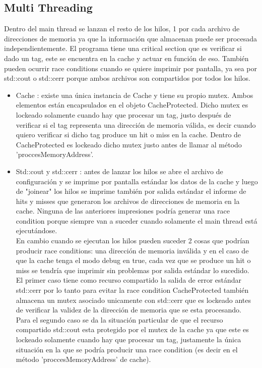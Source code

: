 \documentclass[a4paper,12pt]{report}
\begin{document}
\subsection{Multi Threading}

Dentro del main thread se lanzan el resto de los hilos, 1 por cada archivo de direcciones de memoria ya que la informaci\'on que almacenan puede ser procesada independientemente. El programa tiene una critical section que es verificar si dado un tag, este se encuentra en la cache y actuar en funci\'on de eso. Tambi\'en pueden ocurrir race conditions cuando se quiere imprimir por pantalla, ya sea por std::cout o std::cerr porque ambos archivos son compartidos por todos los hilos.

\begin{itemize}

\item Cache : existe una \'unica instancia de Cache y tiene su propio mutex. Ambos elementos est\'an encapsulados en el objeto CacheProtected. Dicho mutex es lockeado solamente cuando hay que procesar un tag, justo despu\'es de verificar si el tag representa una direcci\'on de memoria v\'alida, es decir cuando quiero verificar si dicho tag produce un hit o miss en la cache. Dentro de CacheProtected es lockeado dicho mutex justo antes de llamar al m\'etodo 'proccesMemoryAddress'.

\item Std::cout y std::cerr : antes de lanzar los hilos se abre el archivo de configuraci\'on y se imprime por pantalla est\'andar los datos de la cache y luego de "joinear" los hilos se imprime tambi\'en por salida est\'andar el informe de hits y misses que generaron los archivos de direcciones de memoria en la cache. Ninguna de las anteriores impresiones podr\'ia generar una race condition porque siempre van a suceder cuando solamente el main thread est\'a ejecut\'andose.\\

En cambio cuando se ejecutan los hilos pueden suceder 2 cosas que podr\'ian producir race conditions: una direcci\'on de memoria inv\'alida y en el caso de que la cache tenga el modo debug en true, cada vez que se produce un hit o miss se tendr\'ia que imprimir sin problemas por salida est\'andar lo sucedido. El primer caso tiene como recurso compartido la salida de error est\'andar std::cerr por lo tanto para evitar la race condition CacheProtected tambi\'en almacena un mutex asociado unicamente con std::cerr que es lockeado antes de verificar la validez de la direcci\'on de memoria que se esta procesando. Para el segundo caso se da la situaci\'on particular de que el recurso compartido std::cout esta protegido por el mutex de la cache ya que este es lockeado solamente cuando hay que procesar un tag, justamente la \'unica situaci\'on en la que se podr\'ia producir una race condition (es decir en el m\'etodo 'proccesMemoryAddress' de cache).

\end{itemize}
\end{document}
